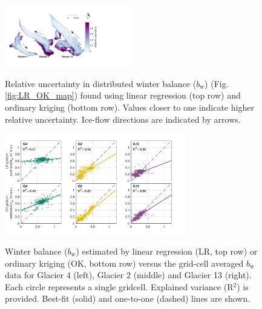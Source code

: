 \documentclass[twocolumn, letterpaper]{igs}
\begin{document}
\begin{figure}
	\centering
	\includegraphics[width =0.5\textwidth]{SpatialVar_LR.pdf}\\
	\caption{Relative uncertainty in distributed winter balance ($b_\mathrm{w}$) (Fig. \ref{fig:LR_OK_map}) found using linear regression (top row) and ordinary kriging (bottom row). Values closer to one indicate higher relative uncertainty. Ice-flow directions are indicated by arrows.}
	\label{fig:WSMBspatialvar}
\end{figure}

\begin{figure}
	\centering
	\includegraphics[width =0.7\textwidth]{observedVSestimated_S2.pdf}\\
	\caption{Winter balance ($b_\mathrm{w}$) estimated by linear regression (LR, top row) or ordinary kriging (OK, bottom row) versus the grid-cell averaged $b_\mathrm{w}$ data for Glacier 4 (left), Glacier 2 (middle) and Glacier 13 (right). Each circle represents a single gridcell. Explained variance (R$^2$) is provided. Best-fit (solid) and one-to-one (dashed) lines are shown.}
	\label{fig:observedVSestimated_S2}
\end{figure}
\end{document}
